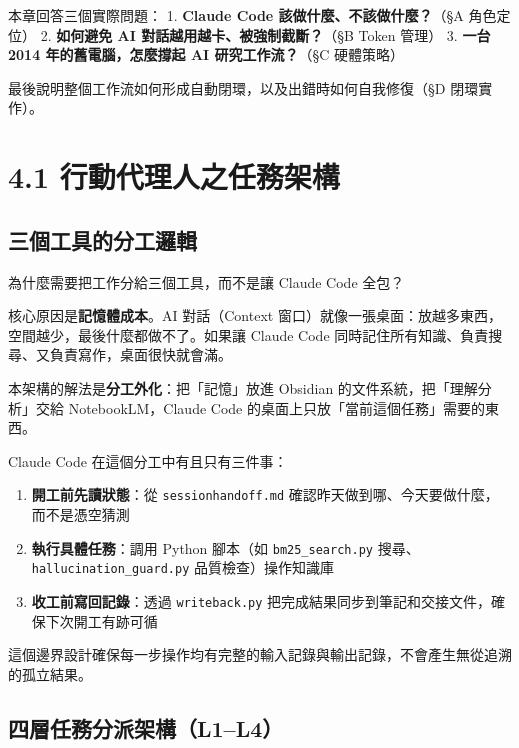 本章回答三個實際問題： 1. \textbf{Claude Code
該做什麼、不該做什麼？}（§A 角色定位） 2. \textbf{如何避免 AI
對話越用越卡、被強制截斷？}（§B Token 管理） 3. \textbf{一台 2014
年的舊電腦，怎麼撐起 AI 研究工作流？}（§C 硬體策略）

最後說明整個工作流如何形成自動閉環，以及出錯時如何自我修復（§D
閉環實作）。

\section{4.1
行動代理人之任務架構}\label{ux884cux52d5ux4ee3ux7406ux4ebaux4e4bux4efbux52d9ux67b6ux69cb}

\subsection{三個工具的分工邏輯}\label{ux4e09ux500bux5de5ux5177ux7684ux5206ux5de5ux908fux8f2f}

為什麼需要把工作分給三個工具，而不是讓 Claude Code 全包？

核心原因是\textbf{記憶體成本}。AI 對話（Context
窗口）就像一張桌面：放越多東西，空間越少，最後什麼都做不了。如果讓
Claude Code 同時記住所有知識、負責搜尋、又負責寫作，桌面很快就會滿。

本架構的解法是\textbf{分工外化}：把「記憶」放進 Obsidian
的文件系統，把「理解分析」交給 NotebookLM，Claude Code
的桌面上只放「當前這個任務」需要的東西。

Claude Code 在這個分工中有且只有三件事：

\begin{enumerate}
\def\labelenumi{\arabic{enumi}.}
\tightlist
\item
  \textbf{開工前先讀狀態}：從 \texttt{sessionhandoff.md}
  確認昨天做到哪、今天要做什麼，而不是憑空猜測
\item
  \textbf{執行具體任務}：調用 Python 腳本（如 \texttt{bm25\_search.py}
  搜尋、\texttt{hallucination\_guard.py} 品質檢查）操作知識庫
\item
  \textbf{收工前寫回記錄}：透過 \texttt{writeback.py}
  把完成結果同步到筆記和交接文件，確保下次開工有跡可循
\end{enumerate}

這個邊界設計確保每一步操作均有完整的輸入記錄與輸出記錄，不會產生無從追溯的孤立結果。

\subsection{四層任務分派架構（L1--L4）}\label{ux56dbux5c64ux4efbux52d9ux5206ux6d3eux67b6ux69cbl1l4}

